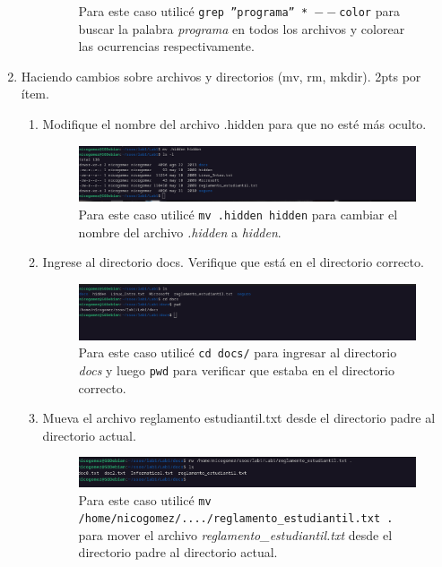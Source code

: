 \documentclass{templateNote}
\begin{document}
\begin{enumerate}
\begin{enumerate}[label=\alph*)]
\begin{figure}[H]
            Para este caso utilicé \texttt{grep ''programa'' * $--$color} para buscar la palabra \textit{programa} en todos los archivos y colorear las ocurrencias respectivamente.
        \end{figure}
    \end{enumerate}
    \item Haciendo cambios sobre archivos y directorios (mv, rm, mkdir). 2pts por ítem.
    \begin{enumerate}[label=\alph*)]
        \item Modifique el nombre del archivo .hidden para que no esté más oculto.
        \begin{figure}[H]
            \centering
            \includegraphics[width=\textwidth]{img/ejerc5a.png}
            Para este caso utilicé \texttt{mv .hidden hidden} para cambiar el nombre del archivo \textit{.hidden} a \textit{hidden}.
        \end{figure}
        \item Ingrese al directorio docs. Verifique que está en el directorio correcto.
        \begin{figure}[H]
            \centering
            \includegraphics[width=\textwidth]{img/ejerc5b.png}
            Para este caso utilicé \texttt{cd docs/} para ingresar al directorio \textit{docs} y luego \texttt{pwd} para verificar que estaba en el directorio correcto.
        \end{figure}
        \item Mueva el archivo reglamento estudiantil.txt desde el directorio padre al directorio actual.
        \begin{figure}[H]
            \centering
            \includegraphics[width=\textwidth]{img/ejerc5c.png}
            Para este caso utilicé \texttt{mv /home/nicogomez/..../reglamento\_estudiantil.txt .} para mover el archivo \textit{reglamento\_estudiantil.txt} desde el directorio padre al directorio actual.

\end{figure}
\end{enumerate}
\end{enumerate}
\end{document}
